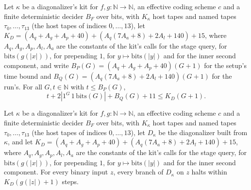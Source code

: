 \begin{theorem}
\label{Turing.NTimeDiag.dz_K_bound}
\leanok
{}
Let $\kappa$ be a diagonalizer's kit for $f, g : \mathbb{N} \to \mathbb{N}$, an effective coding scheme $c$ and a finite deterministic decider $B_F$ over bits, with $K_\kappa$ host tapes and named tapes $\tau_0, \dots, \tau_{13}$ (the host tapes of indices $0, \dots, 13$), let $K_D = (A_q + A_g + A_p + 40) + (A_q(7A_a + 8) + 2A_l + 140) + 15$, where $A_q, A_g, A_p, A_l, A_a$ are the constants of the kit's calls for the stage query, for $\mathrm{bits}(g(|x|))$, for prepending $1$, for $y \mapsto \mathrm{bits}(|y|)$ and for the inner second component, and write $B_P(G) = (A_q + A_g + A_p + 40)(G + 1)$ for the setup's time bound and $B_Q(G) = (A_q(7A_a + 8) + 2A_l + 140)(G + 1)$ for the run's. For all $G, t \in \mathbb{N}$ with $t \le B_P(G)$, \[ t + 2|1^G\,1\,\mathrm{bits}(G)| + B_Q(G) + 11 \le K_D (G + 1). \]
\end{theorem}

\begin{theorem}
\label{Turing.NTimeDiag.dz_halts}
\leanok
{}
Let $\kappa$ be a diagonalizer's kit for $f, g : \mathbb{N} \to \mathbb{N}$, an effective coding scheme $c$ and a finite deterministic decider $B_F$ over bits, with $K_\kappa$ host tapes and named tapes $\tau_0, \dots, \tau_{13}$ (the host tapes of indices $0, \dots, 13$), let $D_\kappa$ be the diagonalizer built from $\kappa$, and let $K_D = (A_q + A_g + A_p + 40) + (A_q(7A_a + 8) + 2A_l + 140) + 15$, where $A_q, A_g, A_p, A_l, A_a$ are the constants of the kit's calls for the stage query, for $\mathrm{bits}(g(|x|))$, for prepending $1$, for $y \mapsto \mathrm{bits}(|y|)$ and for the inner second component. For every binary input $z$, every branch of $D_\kappa$ on $z$ halts within $K_D(g(|z|) + 1)$ steps.
\end{theorem}

